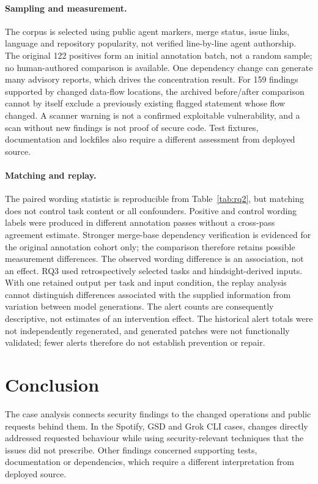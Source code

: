\documentclass[acmsmall,screen,nonacm]{acmart}
\begin{document}
\paragraph{Sampling and measurement.} The corpus is selected using public agent markers, merge status, issue links, language and repository popularity, not verified line-by-line agent authorship. The original 122 positives form an initial annotation batch, not a random sample; no human-authored comparison is available. One dependency change can generate many advisory reports, which drives the concentration result. For 159 findings supported by changed data-flow locations, the archived before/after comparison cannot by itself exclude a previously existing flagged statement whose flow changed. A scanner warning is not a confirmed exploitable vulnerability, and a scan without new findings is not proof of secure code. Test fixtures, documentation and lockfiles also require a different assessment from deployed source.

\paragraph{Matching and replay.} The paired wording statistic is reproducible from Table~\ref{tab:rq2}, but matching does not control task content or all confounders. Positive and control wording labels were produced in different annotation passes without a cross-pass agreement estimate. Stronger merge-base dependency verification is evidenced for the original annotation cohort only; the comparison therefore retains possible measurement differences. The observed wording difference is an association, not an effect. RQ3 used retrospectively selected tasks and hindsight-derived inputs. With one retained output per task and input condition, the replay analysis cannot distinguish differences associated with the supplied information from variation between model generations. The alert counts are consequently descriptive, not estimates of an intervention effect. The historical alert totals were not independently regenerated, and generated patches were not functionally validated; fewer alerts therefore do not establish prevention or repair.

\section{Conclusion}

The case analysis connects security findings to the changed operations and public requests behind them. In the Spotify, GSD and Grok CLI cases, changes directly addressed requested behaviour while using security-relevant techniques that the issues did not prescribe. Other findings concerned supporting tests, documentation or dependencies, which require a different interpretation from deployed source.
\end{document}
